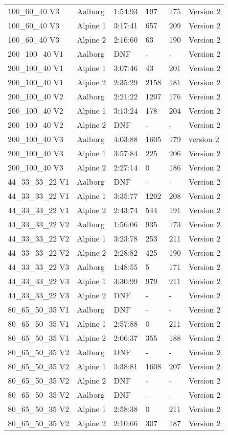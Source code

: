 \documentclass[pt,twoside,a4paper]{article}
\begin{document}
\begin{table}[h]
\begin{tabular}{llllll}
 100\_60\_40 V3 & Aalborg & 1:54:93  & 197 & 175 & Version 2   \\ 
 100\_60\_40 V3 & Alpine 1 & 3:17:41  & 657 & 209 & Version 2   \\ 
 100\_60\_40 V3 & Alpine 2 & 2:16:60  & 63 & 190 & Version 2   \\ \hline 
 200\_100\_40 V1 & Aalborg & DNF & - & - & Version 2 \\
 200\_100\_40 V1 & Alpine 1 & 3:07:46 & 43 & 201 & Version 2 \\
 200\_100\_40 V1 & Alpine 2 & 2:35:29 & 2158 & 181 & Version 2 \\ \hline
 200\_100\_40 V2 & Aalborg & 2:21:22 & 1207 & 176 & Version 2 \\
 200\_100\_40 V2 & Alpine 1 & 3:13:24 & 178 & 204 & Version 2 \\
 200\_100\_40 V2 & Alpine 2 & DNF & - & - & Version 2 \\  \hline
 200\_100\_40 V3 & Aalborg & 4:03:88 & 1605 & 179 & version 2 \\
 200\_100\_40 V3 & Alpine 1 & 3:57:84 & 225 & 206 & Version 2 \\
 200\_100\_40 V3 & Alpine 2 & 2:27:14 & 0 & 186 & Version 2 \\ \hline
 44\_33\_33\_22 V1 & Aalborg & DNF & - & - & Version 2 \\
 44\_33\_33\_22 V1 & Alpine 1 & 3:35:77 & 1202 & 208 & Version 2 \\
 44\_33\_33\_22 V1 & Alpine 2 & 2:43:74 & 544 & 191 & Version 2 \\ \hline
 44\_33\_33\_22 V2 & Aalborg & 1:56:06 & 935 & 173 & Version 2 \\
 44\_33\_33\_22 V2 & Alpine 1 & 3:23:78 & 253 & 211 & Version 2 \\
 44\_33\_33\_22 V2 & Alpine 2 & 2:28:82 & 425 & 190 & Version 2 \\ \hline
 44\_33\_33\_22 V3 & Aalborg & 1:48:55 & 5 & 171 & Version 2 \\
 44\_33\_33\_22 V3 & Alpine 1 & 3:30:99 & 979 & 211 & Version 2 \\
 44\_33\_33\_22 V3 & Alpine 2 & DNF & - & - & Version 2 \\ \hline
 80\_65\_50\_35 V1 & Aalborg & DNF & - & - & Version 2 \\
 80\_65\_50\_35 V1 & Alpine 1 & 2:57:88 & 0 & 211 & Version 2 \\
 80\_65\_50\_35 V1 & Alpine 2 & 2:06:37 & 355 & 188 & Version 2 \\ \hline
 80\_65\_50\_35 V2 & Aalborg & DNF & - & - & Version 2 \\
 80\_65\_50\_35 V2 & Alpine 1 & 3:38:81 & 1608 & 207 & Version 2 \\
 80\_65\_50\_35 V2 & Alpine 2 & DNF & - & - & Version 2 \\ \hline 
 80\_65\_50\_35 V2 & Aalborg & DNF & - & - & Version 2 \\
 80\_65\_50\_35 V2 & Alpine 1 & 2:58:38 & 0 & 211 & Version 2 \\
 80\_65\_50\_35 V2 & Alpine 2 & 2:10:66 & 307 & 187 & Version 2 \\ \hline
\end{tabular}
\end{table}
\end{document}
